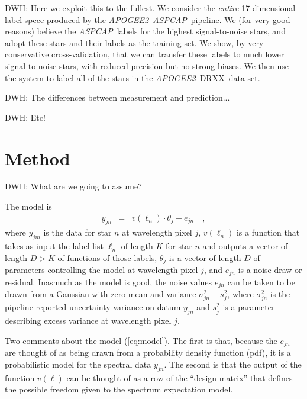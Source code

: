\documentclass[12pt,preprint]{aastex}
\newcommand{\project}[1]{\textsl{#1}}
\newcommand{\acronym}[1]{{\small{#1}}}
\newcommand{\apogee}{\project{\acronym{APOGEE2}}}
\newcommand{\aspcap}{\project{\acronym{ASPCAP}}}
\newcommand{\dr}{\acronym{DRXX}}
\begin{document}
DWH: Here we exploit this to the fullest.
We consider the \emph{entire} 17-dimensional label spece produced by
the \apogee\ \aspcap\ pipeline.
We (for very good reasons) believe the \aspcap\ labels for the highest
signal-to-noise stars, and adopt these stars and their labels as the
training set.
We show, by very conservative cross-validation, that we can transfer these
labels to much lower signal-to-noise stars, with reduced precision but no
strong biases.
We then use the system to label all of the stars in the \apogee\ \dr\ data set.

DWH: The differences between measurement and prediction...

DWH: Etc!

\section{Method}

DWH: What are we going to assume?

The model is
\begin{eqnarray}
  y_{jn} &=& v(\ell_n)\cdot\theta_j + e_{jn}
  \label{eq:model}\quad ,
\end{eqnarray}
where $y_{jm}$ is the data for star $n$ at wavelength pixel $j$,
$v(\ell_n)$ is a function that takes as input
the label list $\ell_n$ of length $K$ for star $n$
and outputs a vector of length $D>K$ of functions of those labels,
$\theta_j$ is a vector of length $D$ of parameters controlling the model at wavelength pixel $j$,
and $e_{jn}$ is a noise draw or residual.
Inasmuch as the model is good, the noise values $e_{jn}$ can be taken to be
drawn from a Gaussian with zero mean and variance $\sigma^2_{jn}+s^2_j$,
where $\sigma^2_{jn}$ is the pipeline-reported uncertainty variance on datum
$y_{jn}$ and $s^2_j$ is a parameter describing excess variance at wavelength pixel $j$.

Two comments about the model (\ref{eq:model}).
The first is that, because the $e_{jn}$ are thought of as being drawn from a 
probability density function (pdf), it is a probabilistic model for the spectral
data $y_{jn}$.
The second is that the output of the function $v(\ell)$ can be thought
of as a row of the ``design matrix'' that defines the possible freedom
given to the spectrum expectation model.
\end{document}
